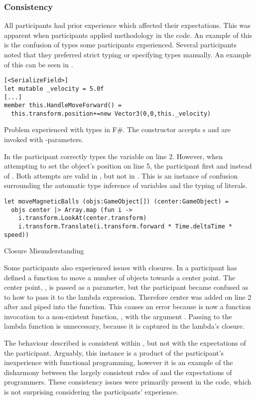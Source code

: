 \subsubsection{Consistency}\label{sec:part-cons} %
All participants had prior \cs experience which affected their expectations. This was apparent when participants applied \cs methodology in the \fs code. An example of this is the confusion of types some participants experienced. Several participants noted that they preferred strict typing or specifying types manually. An example of this can be seen in .

\begin{listing}[H]
\begin{verbatim}
[<SerializeField>]
let mutable _velocity = 5.0f
[...]
member this.HandleMoveForward() =
  this.transform.position+=new Vector3(0,0,this._velocity)
\end{verbatim}
\caption{Problem experienced with types in F\#. The  constructor accepts s and are invoked with -parameters.}
\label{lst:type-conf}
\end{listing}

In  the participant correctly types the  variable on line 2. However, when attempting to set the object's position on line 5, the participant first  and  instead of . Both attempts are valid in \cs, but not in \fs. This is an instance of confusion surrounding the automatic type inference of variables and the typing of literals.

\begin{listing}[H]
\begin{verbatim}
let moveMagneticBalls (objs:GameObject[]) (center:GameObject) =
  objs center |> Array.map (fun i ->
    i.transform.LookAt(center.transform)
    i.transform.Translate(i.transform.forward * Time.deltaTime * speed))
\end{verbatim}
\caption{Closure Misunderstanding}
\label{lst:clos-mis}
\end{listing}

Some participants also experienced issues with closures. In  a participant has defined a function to move a number of objects towards a center point. The center point, , is passed as a parameter, but the participant became confused as to how to pass it to the lambda expression. Therefore center was added on line 2 after  and piped into the  function. This causes an error because  is now a function invocation to a non-existent function, , with the argument . Passing  to the lambda function is unnecessary, because it is captured in the lambda's closure.

The behaviour described is consistent within \fs, but not with the expectations of the participant. Arguably, this instance is a product of the participant's inexperience with functional programming, however it is an example of the disharmony between the largely consistent rules of \fs and the expectations of programmers. These consistency issues were primarily present in the \fs code, which is not surprising considering the participants' experience.
